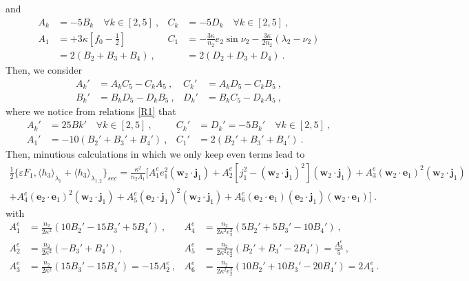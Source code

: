\documentclass[a4paper]{article}
\begin{document}
and
\begin{align}
\label{R1}
A_{k}&=-5B_{k} \quad \forall k \in \left[2,5\right]  \ , 
&C_{k}&=-5D_{k}  \quad \forall k \in \left[2,5\right] \ , \\
A_{1}&=+3\kappa \left[f_{0}-\frac{1}{2} \right]   
&C_{1}&=-\frac{3 \kappa}{n_{2}}e_{2}\sin{\nu_{2}} - \frac{3 \kappa}{2n_{2}} (\lambda_{2}-\nu_{2}) \\
&=2(B_{2}+B_{3}+B_{4}) \ , &&=2(D_{2}+D_{3}+D_{4}) \ .
\end{align}
Then, we consider 
\begin{align}
A_{k}'&=A_{k}C_{5}-C_{k}A_{5} \ ,  &C_{k}'&=A_{k}D_{5}-C_{k}B_{5} \ , \\
B_{k}'&=B_{k}D_{5}-D_{k}B_{5} \ ,  &D_{k}'&=B_{k}C_{5}-D_{k}A_{5} \ ,
\end{align}
where we notice from relations \eqref{R1} that
\begin{align}
A_{k}'&=25B{k}' \quad \forall k \in \left[2,5\right] \ , &C_{k}'&=D_{k}'=-5B_{k}'  \quad \forall k \in \left[2,5\right] \ , \\
 A_{1}'&=-10(B_{2}'+B_{3}'+B_{4}') \ ,  &C_{1}'&=2(B_{2}'+B_{3}'+B_{4}') \ .
\end{align}
Then, minutious calculations in which we only keep even terms lead to
\begin{equation}
\begin{split}
\frac{1}{2}\{\varepsilon F_{1}, \langle  h_{3} \rangle  _{\lambda_{1}} +  \langle h_{3} \rangle _{\lambda_{1,2}}\}_{sec}
=\frac{\kappa^2}{n_{2}\Lambda_{1}} \biggl[ A_{1}^{e}e_{1}^{2}(\mathbf w_{2} \cdot \mathbf j_{1})
+A_{2}^{e}\left[ j_{1}^{2} - (\mathbf w_{2} \cdot \mathbf j_{1})^2 \right] (\mathbf w_{2} \cdot \mathbf j_{1})
+A_{3}^{e}(\mathbf w_{2} \cdot \mathbf e_{1})^{2} (\mathbf w_{2} \cdot \mathbf j_{1}) \\
+A_{4}^{e}(\mathbf e_{2} \cdot \mathbf e_{1})^{2} (\mathbf w_{2} \cdot \mathbf j_{1})
+A_{5}^{e}(\mathbf e_{2} \cdot \mathbf j_{1})^{2} (\mathbf w_{2} \cdot \mathbf j_{1})
+A_{6}^{e}(\mathbf e_{2} \cdot \mathbf e_{1}) (\mathbf e_{2} \cdot \mathbf j_{1}) (\mathbf w_{2} \cdot \mathbf e_{1}) \biggr] \ .
\end{split}
\end{equation}
with
\begin{align}
A_{1}^{e}&=\frac{n_{2}}{2\kappa^2}(10B_{2}'-15B_{3}'+5B_{4}') \ ,  &A_{4}^{e}&=\frac{n_{2}}{2\kappa^2e_{2}^{2}}(5B_{2}'+5B_{3}'-10B_{4}') \ , \\
A_{2}^{e}&=\frac{n_{2}}{2\kappa^2}(-B_{3}'+B_{4}')  \ ,  &A_{5}^{e}&=\frac{n_{2}}{2\kappa^2e_{2}^{2}}(B_{2}'+B_{3}'-2B_{4}') =\frac{A_{4}^{e}}{5}  \ , \\
A_{3}^{e}&=\frac{n_{2}}{2\kappa^2}(15B_{3}'-15B_{4}')=-15A_{2}^{e} \ ,  &A_{6}^{e}&=\frac{n_{2}}{2\kappa^2e_{2}^{2}}(10B_{2}'+10B_{3}'-20B_{4}') =2A_{4}^{e} \ .
\end{align}
\end{document}
